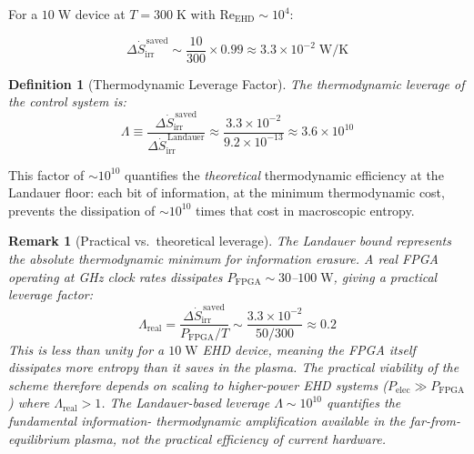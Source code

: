 \documentclass[12pt,twocolumn]{article}
\newtheorem{definition}{Definition}
\newtheorem{remark}{Remark}
\newcommand{\Sdot}{\dot{S}_{\mathrm{irr}}}
\newcommand{\Reehd}{\mathrm{Re}_{\mathrm{EHD}}}
\begin{document}
For a $10\;\mathrm{W}$ device at $T = 300\;\mathrm{K}$ with
$\Reehd \sim 10^4$:

\begin{equation}
  \Delta\Sdot^{\,\mathrm{saved}}
  \sim \frac{10}{300} \times 0.99
  \approx 3.3 \times 10^{-2}\;\mathrm{W/K}
  \label{eq:entropy_saved_num}
\end{equation}

\begin{definition}[Thermodynamic Leverage Factor]
\label{def:leverage}
The thermodynamic leverage of the control system is:
\begin{equation}
  \Lambda
  \equiv \frac{\Delta\Sdot^{\,\mathrm{saved}}}
              {\Delta\Sdot^{\,\mathrm{Landauer}}}
  \approx \frac{3.3 \times 10^{-2}}{9.2 \times 10^{-13}}
  \approx 3.6 \times 10^{10}
  \label{eq:leverage}
\end{equation}
\end{definition}

This factor of $\sim 10^{10}$ quantifies the \emph{theoretical}
thermodynamic efficiency at the Landauer floor: each bit of
information, at the minimum thermodynamic cost, prevents the
dissipation of $\sim 10^{10}$ times that cost in macroscopic entropy.

\begin{remark}[Practical vs.\ theoretical leverage]
The Landauer bound represents the absolute thermodynamic minimum for
information erasure. A real FPGA operating at GHz clock rates
dissipates $P_{\mathrm{FPGA}} \sim 30$--$100\;\mathrm{W}$, giving a
practical leverage factor:
\begin{equation}
  \Lambda_{\mathrm{real}}
  = \frac{\Delta\Sdot^{\,\mathrm{saved}}}{P_{\mathrm{FPGA}}/T}
  \sim \frac{3.3 \times 10^{-2}}{50/300}
  \approx 0.2
  \label{eq:leverage_real}
\end{equation}
This is less than unity for a $10\;\mathrm{W}$ EHD device, meaning
the FPGA itself dissipates more entropy than it saves in the plasma.
The practical viability of the scheme therefore depends on scaling to
higher-power EHD systems ($P_{\mathrm{elec}} \gg P_{\mathrm{FPGA}}$)
where $\Lambda_{\mathrm{real}} > 1$. The Landauer-based leverage
$\Lambda \sim 10^{10}$ quantifies the \emph{fundamental} information-
thermodynamic amplification available in the far-from-equilibrium
plasma, not the practical efficiency of current hardware.
\end{remark}

\end{document}
